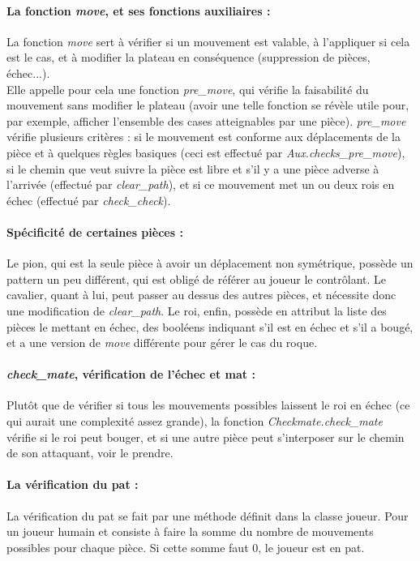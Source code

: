 \documentclass[a4paper]{article}
\begin{document}
\paragraph{La fonction \textit{move}, et ses fonctions auxiliaires :} La fonction \textit{move} sert à vérifier si un mouvement est valable, à l'appliquer si cela est le cas, et à modifier la plateau en conséquence (suppression de pièces, échec...). \\

Elle appelle pour cela une fonction \textit{pre\_move}, qui vérifie la faisabilité du mouvement sans modifier le plateau (avoir une telle fonction se révèle utile pour, par exemple, afficher l'ensemble des cases atteignables par une pièce).
\textit{pre\_move} vérifie plusieurs critères : si le mouvement est conforme aux déplacements de la pièce et à quelques règles basiques (ceci est effectué par \textit{Aux.checks\_pre\_move}), si le chemin que veut suivre la pièce est libre et s'il y a une pièce adverse à l'arrivée (effectué par \textit{clear\_path}), et si ce mouvement met un ou deux rois en échec (effectué par \textit{check\_check}).

\paragraph{Spécificité de certaines pièces :} Le pion, qui est la seule pièce à avoir un déplacement non symétrique, possède un pattern un peu différent, qui est obligé de référer au joueur le contrôlant.
Le cavalier, quant à lui, peut passer au dessus des autres pièces, et nécessite donc une modification de \textit{clear\_path}.
Le roi, enfin, possède en attribut la liste des pièces le mettant en échec, des booléens indiquant s'il est en échec et s'il a bougé, et a une version de \textit{move} différente pour gérer le cas du roque. 

\paragraph{\textit{check\_mate}, vérification de l'échec et mat :} Plutôt que de vérifier si tous les mouvements possibles laissent le roi en échec (ce qui aurait une complexité assez grande), la fonction \textit{Checkmate.check\_mate} vérifie si le roi peut bouger, et si une autre pièce peut s'interposer sur le chemin de son attaquant, voir le prendre.

\paragraph{La vérification du pat :}La vérification du pat se fait par une méthode définit dans la classe joueur. Pour un joueur humain et consiste à faire la somme du nombre de mouvements possibles pour chaque pièce. Si cette somme faut 0, le joueur est en pat. 
\end{document}
